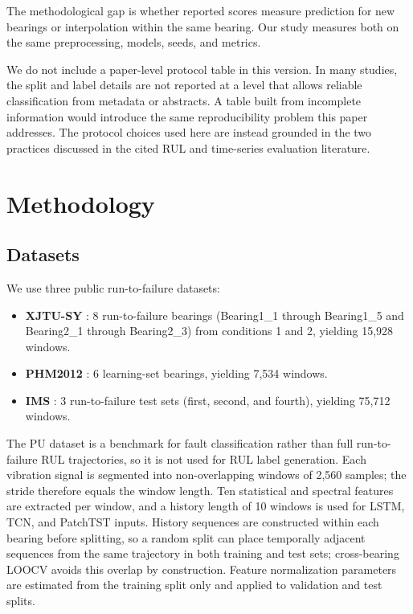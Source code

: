 \documentclass[5p,twocolumn]{elsarticle}
\begin{document}
The methodological gap is whether reported scores measure prediction for new bearings or interpolation within the same bearing. Our study measures both on the same preprocessing, models, seeds, and metrics.

We do not include a paper-level protocol table in this version. In many studies, the split and label details are not reported at a level that allows reliable classification from metadata or abstracts. A table built from incomplete information would introduce the same reproducibility problem this paper addresses. The protocol choices used here are instead grounded in the two practices discussed in the cited RUL and time-series evaluation literature.

\section{Methodology}
\subsection{Datasets}
We use three public run-to-failure datasets:
\begin{itemize}
    \item \textbf{XJTU-SY} \cite{xjtusy2019dataset}: 8 run-to-failure bearings (Bearing1\_1 through Bearing1\_5 and Bearing2\_1 through Bearing2\_3) from conditions 1 and 2, yielding 15,928 windows.
    \item \textbf{PHM2012} \cite{nectoux2012pronostia}: 6 learning-set bearings, yielding 7,534 windows.
    \item \textbf{IMS} \cite{ims2006}: 3 run-to-failure test sets (first, second, and fourth), yielding 75,712 windows.
\end{itemize}
The PU dataset is a benchmark for fault classification rather than full run-to-failure RUL trajectories, so it is not used for RUL label generation. Each vibration signal is segmented into non-overlapping windows of 2,560 samples; the stride therefore equals the window length. Ten statistical and spectral features are extracted per window, and a history length of 10 windows is used for LSTM, TCN, and PatchTST inputs. History sequences are constructed within each bearing before splitting, so a random split can place temporally adjacent sequences from the same trajectory in both training and test sets; cross-bearing LOOCV avoids this overlap by construction. Feature normalization parameters are estimated from the training split only and applied to validation and test splits.
\end{document}
